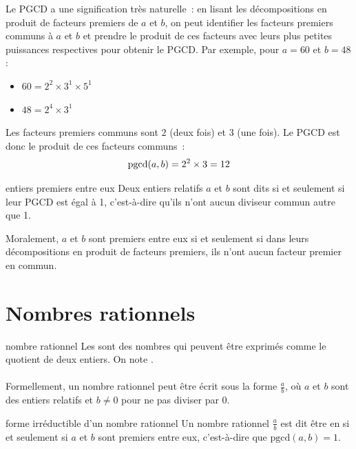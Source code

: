 \begin{enumeratebf}
\begin{remarque}{}{}
    Le PGCD a une signification très naturelle~: en lisant les décompositions en produit de facteurs premiers de \(a\) et \(b\), on peut identifier les facteurs premiers communs à \(a\) et \(b\) et prendre le produit de ces facteurs avec leurs plus petites puissances respectives pour obtenir le PGCD. Par exemple, pour \(a = 60\) et \(b = 48\) :
    \begin{itemize}
        \item \(60 = 2^2 \times 3^1 \times 5^1\)
        \item \(48 = 2^4 \times 3^1\)
    \end{itemize}
    Les facteurs premiers communs sont \(2\) (deux fois) et \(3\) (une fois). Le PGCD est donc le produit de ces facteurs communs~:
    $$\mathrm{pgcd}(a,b) = 2^2 \times 3 = 12$$
\end{remarque}

\begin{definition}{}{entiers premiers entre eux}
    Deux entiers relatifs \(a\) et \(b\) sont dits  si et seulement si leur PGCD est égal à 1, c'est-à-dire qu'ils n'ont aucun diviseur commun autre que 1.
\end{definition}

\begin{remarque}{}{}
    Moralement, $a$ et $b$ sont premiers entre eux si et seulement si dans leurs décompositions en produit de facteurs premiers, ils n'ont aucun facteur premier en commun.
\end{remarque}

\section{Nombres rationnels}

\begin{definition}{}{nombre rationnel}
    Les  sont des nombres qui peuvent être exprimés comme le quotient de deux entiers. On note .\\\\Formellement, un nombre rationnel peut être écrit sous la forme \(\frac{a}{b}\), où \(a\) et \(b\) sont des entiers relatifs et \(b \neq 0\) pour ne pas diviser par 0.
\end{definition}

\begin{definition}{}{forme irréductible d'un nombre rationnel}
    Un nombre rationnel \(\frac{a}{b}\) est dit être en  si et seulement si \(a\) et \(b\) sont premiers entre eux, c'est-à-dire que \(\text{pgcd}(a, b) = 1\).
\end{definition}


\end{enumeratebf}
